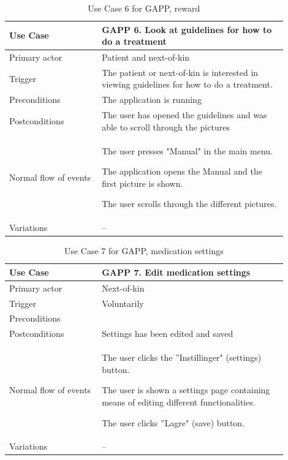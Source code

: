\begin{table}
	\begin{center}
	    \begin{tabular}{|p{0.3\linewidth}|p{0.6\linewidth}|}
		    \hline
		    Use Case & GAPP 6. Look at guidelines for how to do a treatment\\ \hline
		    Primary actor & Patient and next-of-kin \\ \hline
		    Trigger & The patient or next-of-kin is interested in viewing guidelines for how to do a treatment. \\ \hline
		    Preconditions & The application is running \\ \hline
		    Postconditions & The user has opened the guidelines and was able to scroll through the pictures\\ \hline
		    Normal flow of events & 
		    	\begin{tabulenum}
		    	  \item The user presses "Manual" in the main menu.
		    	  \item The application opens the Manual and the first picture is shown.
		    	  \item The user scrolls through the different pictures.
		    	\end{tabulenum} \\ \hline
		    Variations & -- \\ \hline
	    \end{tabular}
    \end{center}
    \caption{Use Case 6 for GAPP, reward}
    \label{tab:gappUseCase6}
\end{table}

\begin{table}
	\begin{center}
	    \begin{tabular}{|p{0.3\linewidth}|p{0.6\linewidth}|}
		    \hline
		    Use Case &  GAPP 7. Edit medication settings \\ \hline
		    Primary actor & Next-of-kin\\ \hline
		    Trigger & Voluntarily\\ \hline
		    Preconditions & \\ \hline
		    Postconditions & Settings has been edited and saved \\ \hline
		    Normal flow of events & 
		    	\begin{tabulenum}
		    	  \item The user clicks the ''Instillinger" (settings) button.
		    	  \item The user is shown a settings page containing means of editing different functionalities.
		    	  \item The user clicks ''Lagre" (save) button.
		    	\end{tabulenum} \\ \hline
		    Variations & -- \\ \hline
	    \end{tabular}
	\end{center}
	\caption{Use Case 7 for GAPP, medication settings}
	\label{tab:gappUseCase7}
\end{table}

